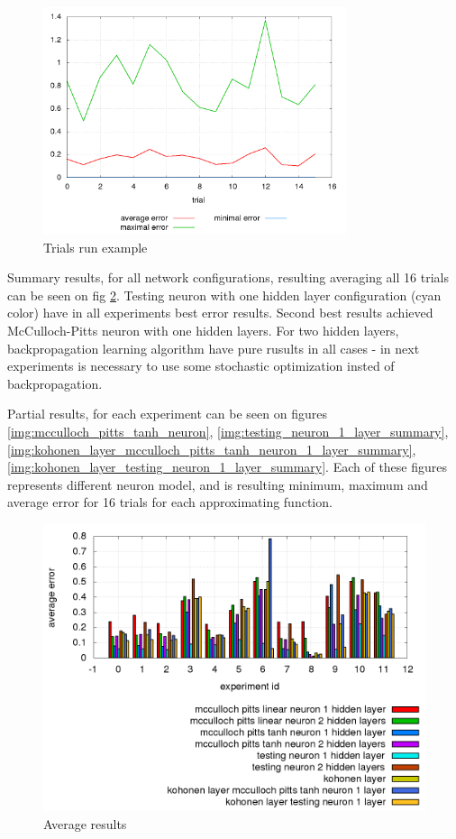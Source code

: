 \documentclass[times]{cpeauth}
\begin{document}
\begin{figure}[!ht]
\centering
\includegraphics[width=3.5in]{images/error_log.png}
\caption{Trials run example}
\label{img:NN Trials run example}
\end{figure}

Summary results, for all network configurations, resulting averaging all 16 trials
can be seen on fig \ref{img:NN Average results}. Testing neuron with one hidden layer
configuration (cyan color) have in all experiments best error results. Second best
results achieved McCulloch-Pitts neuron with one hidden layers. For two hidden layers,
backpropagation learning algorithm have pure rusults in all cases - in next experiments is
necessary to use some stochastic optimization insted of backpropagation.

Partial results, for each experiment can be seen on figures \ref{img:mcculloch_pitts_tanh_neuron},
\ref{img:testing_neuron_1_layer_summary}, \ref{img:kohonen_layer_mcculloch_pitts_tanh_neuron_1_layer_summary},
\ref{img:kohonen_layer_testing_neuron_1_layer_summary}. Each of these figures represents different neuron
model, and is resulting minimum, maximum and average error for 16 trials for each approximating function.


\begin{figure}[!ht]
\centering
\includegraphics[width=4.5in]{images/summary_result_all_average_error_log.png}
\caption{Average results}
\label{img:NN Average results}
\end{figure}
\end{document}
